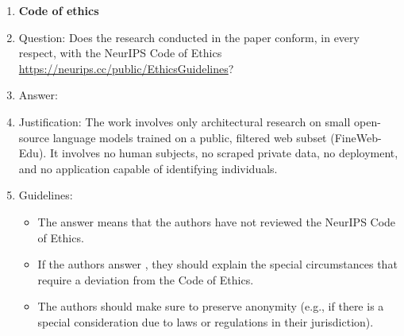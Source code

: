 \begin{enumerate}
\item {\bf Code of ethics}
    \item[] Question: Does the research conducted in the paper conform, in every respect, with the NeurIPS Code of Ethics \url{https://neurips.cc/public/EthicsGuidelines}?
    \item[] Answer: \answerYes{}
    \item[] Justification: The work involves only architectural research on small open-source language models trained on a public, filtered web subset (FineWeb-Edu). It involves no human subjects, no scraped private data, no deployment, and no application capable of identifying individuals.
    \item[] Guidelines:
    \begin{itemize}
        \item The answer \answerNA{} means that the authors have not reviewed the NeurIPS Code of Ethics.
        \item If the authors answer \answerNo, they should explain the special circumstances that require a deviation from the Code of Ethics.
        \item The authors should make sure to preserve anonymity (e.g., if there is a special consideration due to laws or regulations in their jurisdiction).
    \end{itemize}



\end{enumerate}
